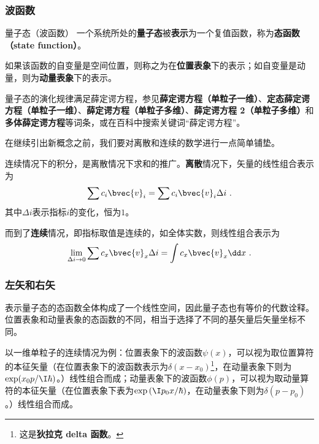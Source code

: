 \subsubsection{波函数}

\begin{definition}{量子态（波函数）}\label{def_QMPrcp_6}
一个系统所处的\textbf{量子态}被\textbf{表示}为一个复值函数，称为\textbf{态函数（state function）}。

如果该函数的自变量是空间位置，则称之为在\textbf{位置表象}下的表示；如自变量是动量，则为\textbf{动量表象}下的表示。
\end{definition}

量子态的演化规律满足薛定谔方程，参见\textbf{薛定谔方程（单粒子一维）}、\textbf{定态薛定谔方程（单粒子一维）}、\textbf{薛定谔方程（单粒子多维）}、\textbf{薛定谔方程 2（单粒子多维）}和\textbf{多体薛定谔方程}等词条，或在百科中搜索关键词“薛定谔方程”。


在继续引出新概念之前，我们要对离散和连续的数学进行一点简单铺垫。

连续情况下的积分，是离散情况下求和的推广。\textbf{离散}情况下，矢量的线性组合表示为
\begin{equation}
\sum c_i\bvec{v}_i = \sum c_i\bvec{v}_i \Delta i~.
\end{equation}
其中$\Delta i$表示指标$i$的变化，恒为$1$。

而到了\textbf{连续}情况，即指标取值是连续的，如全体实数，则线性组合表示为
\begin{equation}
\lim\limits_{\Delta i\to 0}\sum c_x\bvec{v}_x \Delta i=\int c_x\bvec{v}_x \dd x~.
\end{equation}



\subsubsection{左矢和右矢}

表示量子态的态函数全体构成了一个线性空间，因此量子态也有等价的代数诠释。位置表象和动量表象的态函数的不同，相当于选择了不同的基矢量后矢量坐标不同。

以一维单粒子的连续情况为例：位置表象下的波函数$\psi(x)$，可以视为取位置算符的本征矢量（在位置表象下的波函数表示为$\delta(x-x_0)$\footnote{这是\textbf{狄拉克 delta 函数}。}，在动量表象下则为$\exp(x_0p/\I\hbar)$。）线性组合而成；动量表象下的波函数$\phi(p)$，可以视为取动量算符的本征矢量（在位置表象下表为$\exp{(\I p_0 x/\hbar)}$，在动量表象下则为$\delta(p-p_0)$。）线性组合而成。


